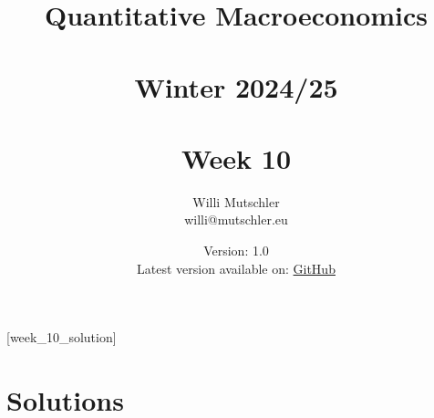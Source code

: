 
\newif\ifDisplaySolutions\DisplaySolutionstrue%


\title{Quantitative Macroeconomics\\~\\Winter 2024/25\\~\\Week 10}
\author{Willi Mutschler\\willi@mutschler.eu}
\date{Version: 1.0\\Latest version available on: \href{https://github.com/wmutschl/Quantitative-Macroeconomics/releases/latest/download/week_10.pdf}{GitHub}}
\maketitle\thispagestyle{empty}

\newpage
{}[week_10_solution]
\tableofcontents\thispagestyle{empty}\newpage

\setcounter{page}{1}
\newpage
\newpage
\newpage
\newpage

\printbibliography%
\newpage

\ifDisplaySolutions%
\newpage
\appendix
\section{Solutions}

\fi
